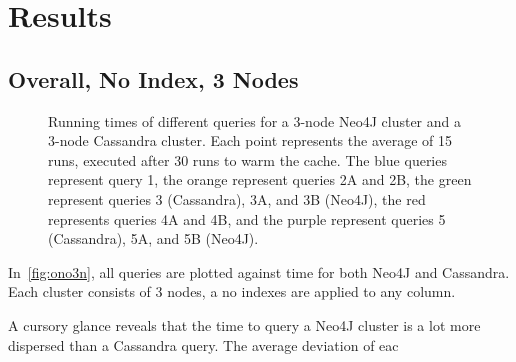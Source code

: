 \section{Results}\label{sec:results}

\subsection{Overall, No Index, 3 Nodes}\label{subsec:overall,NoIndex,3Nodes}
\begin{figure}
    \caption{Running times of different queries for a 3-node Neo4J cluster and a 3-node Cassandra cluster.
    Each point represents the average of 15 runs, executed after 30 runs to warm the cache.
    The blue queries represent query 1, the orange represent queries 2A and 2B, the green represent queries 3
    (Cassandra), 3A, and 3B (Neo4J), the red represents queries 4A and 4B, and the purple represent queries 5
    (Cassandra), 5A, and 5B (Neo4J).}\label{fig:ono3n}
\end{figure}

In~\autoref{fig:ono3n}, all queries are plotted against time for both Neo4J and Cassandra.
Each cluster consists of 3 nodes, a no indexes are applied to any column.

A cursory glance reveals that the time to query a Neo4J cluster is a lot more dispersed than a Cassandra query.
The average deviation of eac
